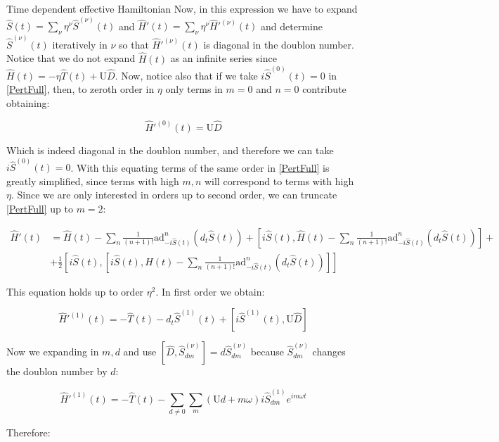 \begin{section}{Time dependent effective Hamiltonian}
Now, in this expression we have to expand $\hat{S}(t) = \sum_\nu \eta^\nu \hat{S}^{(\nu)}(t)$ and $\hat{H}'(t) = \sum_\nu \eta^\nu \hat{H}'^{(\nu)}(t)$ and determine $\hat{S}^{(\nu)}(t)$ iteratively in $\nu$ so that $\hat{H}'^{(\nu)}(t)$ is diagonal in the doublon number. Notice that we do not expand $\hat{H}(t)$ as an infinite series since $\hat{H}(t) = -\eta \hat{T}(t) + \text{U}\hat{D}$. Now, notice also that if we take $i\hat{S}^{(0)}(t)=0$ in \ref{PertFull}, then, to zeroth order in $\eta$ only terms in $m=0$ and $n=0$ contribute obtaining:

\begin{equation}
\hat{H}'^{(0)}(t) = \text{U}\hat{D}
\end{equation}

Which is indeed diagonal in the doublon number, and therefore we can take $i\hat{S}^{(0)}(t)=0$. With this equating terms of the same order in \ref{PertFull} is greatly simplified, since terms with high $m,n$ will correspond to terms with high $\eta$. Since we are only interested in orders up to second order, we can truncate \ref{PertFull} up to $m=2$:

\begin{align}
\label{PertTrunc}
\hat{H}'(t) &=  \hat{H}(t) - \sum_n \frac{1}{(n+1)!}\text{ad}_{-i\hat{S}(t)}^n (d_t \hat{S}(t)) + [i\hat{S}(t), \hat{H}(t) - \sum_n \frac{1}{(n+1)!}\text{ad}_{-i\hat{S}(t)}^n (d_t \hat{S}(t))] + \nonumber \\
&+ \frac{1}{2} [i\hat{S}(t),[i\hat{S}(t), \hat{H}(t) - \sum_n \frac{1}{(n+1)!}\text{ad}_{-i\hat{S}(t)}^n (d_t \hat{S}(t)) ]]
\end{align}

This equation holds up to order $\eta^2$. In first order we obtain:

\begin{equation}
\label{1stO}
\hat{H}'^{(1)}(t) = -\hat{T}(t) - d_t\hat{S}^{(1)}(t) + \left[ i\hat{S}^{(1)}(t), \text{U}\hat{D} \right]
\end{equation}

Now we expanding in $m,d$ and use $\left[ \hat{D}, \hat{S}^{(\nu)}_{dm} \right] = d\hat{S}^{(\nu)}_{dm}$ because $\hat{S}^{(\nu)}_{dm}$ changes the doublon number by $d$:

\begin{equation}
\hat{H}'^{(1)}(t)=-\hat{T}(t)-\sum_{d\neq 0}\sum_m (\text{U}d+m\omega) i\hat{S}^{(1)}_{dm} e^{im\omega t}
\end{equation}

Therefore:


\end{section}
